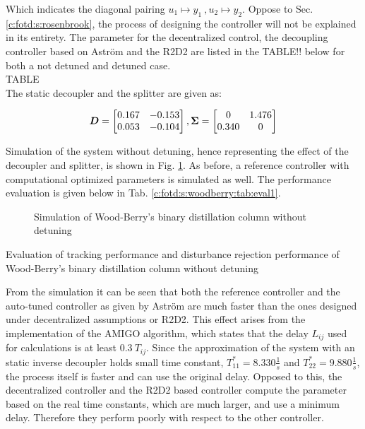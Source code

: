 Which indicates the diagonal pairing $u_1 \mapsto y_1~, u_2 \mapsto y_2$. Oppose to Sec.\ref{c:fotd:s:rosenbrook}, the process of designing the controller will not be explained in its entirety. The parameter for the decentralized control, the decoupling controller based on Astr\"om and the R2D2 are listed in the TABLE!! below for both a not detuned and detuned case.\\

TABLE\\

The static decoupler and the splitter are given as:

\begin{align*}
\mbox{\boldmath$D$} = \begin{bmatrix}
0.167 & -0.153 \\
0.053 & -0.104
\end{bmatrix}, \mbox{\boldmath$\Sigma$} = \begin{bmatrix}
0 & 1.476 \\
0.340 & 0
\end{bmatrix}
\end{align*}

Simulation of the system without detuning, hence representing the effect of the decoupler and splitter, is shown in Fig. \ref{c:fotd:s:woodberry:f:SimNotDetuned}. As before, a reference controller \cite{Astrom2001a} with computational optimized parameters is simulated as well. The performance evaluation is given below in Tab. \ref{c:fotd:s:woodberry:tab:eval1}.

\begin{figure}[H]\centering

\caption{Simulation of Wood-Berry's binary distillation column without detuning}
\label{c:fotd:s:woodberry:f:SimNotDetuned}
\end{figure}

\begin{table}[H]
\centering
\caption{Evaluation of tracking performance and disturbance rejection performance of Wood-Berry's binary distillation column without detuning}
\label{c:fotd:s:woodberry:tab:eval1}

\end{table}

From the simulation it can be seen that both the reference controller and the auto-tuned controller as given by Astr\"om are much faster than the ones designed under decentralized assumptions or R2D2. This effect arises from the implementation of the AMIGO algorithm, which states that the delay $L_{ij}$ used for calculations is at least $0.3~T_{ij}$. Since the approximation of the system with an static inverse decoupler holds small time constant, $T_{11}^* = 8.330 \frac{1}{s}$ and $T_{22}^* = 9.880 \frac{1}{s}$, the process itself is faster and can use the original delay. Opposed to this, the decentralized controller and the R2D2 based controller compute the parameter based on the real time constants, which are much larger, and use a minimum delay. Therefore they perform poorly with respect to the other controller.\\

